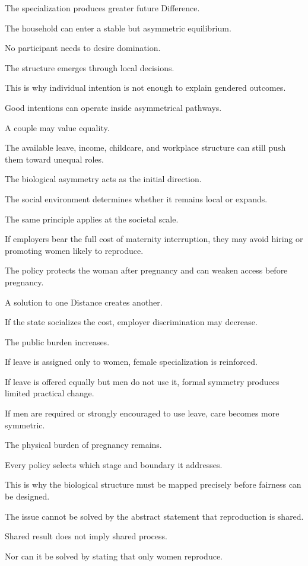 The specialization produces greater future Difference.

The household can enter a stable but asymmetric equilibrium.

No participant needs to desire domination.

The structure emerges through local decisions.

This is why individual intention is not enough to explain gendered outcomes.

Good intentions can operate inside asymmetrical pathways.

A couple may value equality.

The available leave, income, childcare, and workplace structure can still push them toward unequal roles.

The biological asymmetry acts as the initial direction.

The social environment determines whether it remains local or expands.

The same principle applies at the societal scale.

If employers bear the full cost of maternity interruption, they may avoid hiring or promoting women likely to reproduce.

The policy protects the woman after pregnancy and can weaken access before pregnancy.

A solution to one Distance creates another.

If the state socializes the cost, employer discrimination may decrease.

The public burden increases.

If leave is assigned only to women, female specialization is reinforced.

If leave is offered equally but men do not use it, formal symmetry produces limited practical change.

If men are required or strongly encouraged to use leave, care becomes more symmetric.

The physical burden of pregnancy remains.

Every policy selects which stage and boundary it addresses.

This is why the biological structure must be mapped precisely before fairness can be designed.

The issue cannot be solved by the abstract statement that reproduction is shared.

Shared result does not imply shared process.

Nor can it be solved by stating that only women reproduce.

